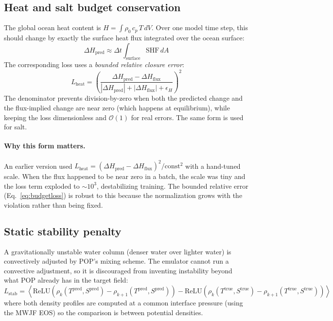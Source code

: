 \documentclass[11pt]{article}
\begin{document}
\subsection{Heat and salt budget conservation}
\label{sec:budgets}
The global ocean heat content is $H=\int\rho_0\,c_p\,T\,dV$. Over one model
time step, this should change by exactly the surface heat flux integrated over
the ocean surface:
\begin{equation}
\Delta H_\text{pred} \approx \Delta t\int_\text{surface} \text{SHF}\,dA
\end{equation}
The corresponding loss uses a \emph{bounded relative closure error}:
\begin{equation}
L_\text{heat}
= \left(\frac{\Delta H_\text{pred} - \Delta H_\text{flux}}
           {|\Delta H_\text{pred}| + |\Delta H_\text{flux}| + \epsilon_H}\right)^2
\label{eq:budgetloss}
\end{equation}
The denominator prevents division-by-zero when both the predicted change and
the flux-implied change are near zero (which happens at equilibrium), while
keeping the loss dimensionless and $\mathcal{O}(1)$ for real errors. The same
form is used for salt.

\paragraph{Why this form matters.}
An earlier version used $L_\text{heat} = (\Delta H_\text{pred} - \Delta H_\text{flux})^2/\text{const}^2$
with a hand-tuned scale. When the flux happened to be near zero in a batch,
the scale was tiny and the loss term exploded to $\sim10^3$, destabilizing
training. The bounded relative error (Eq.~\ref{eq:budgetloss}) is robust to
this because the normalization grows with the violation rather than being fixed.

\subsection{Static stability penalty}
A gravitationally unstable water column (denser water over lighter water) is
convectively adjusted by POP's mixing scheme. The emulator cannot run a
convective adjustment, so it is discouraged from inventing instability beyond
what POP already has in the target field:
\begin{equation}
L_\text{stab}
= \left\langle
  \text{ReLU}\!\left(\rho_k(T^\text{pred},S^\text{pred})
                   - \rho_{k+1}(T^\text{pred},S^\text{pred})\right)
  - \text{ReLU}\!\left(\rho_k(T^\text{true},S^\text{true})
                   - \rho_{k+1}(T^\text{true},S^\text{true})\right)
  \right\rangle
\end{equation}
where both density profiles are computed at a common interface pressure
(using the MWJF EOS) so the comparison is between potential densities.
\end{document}
